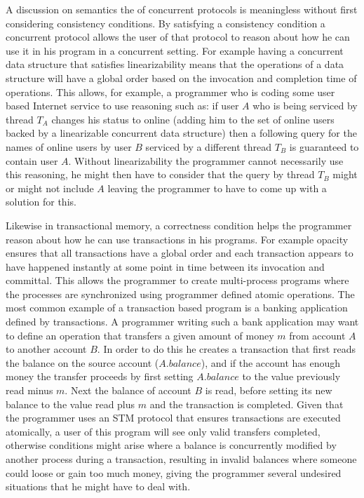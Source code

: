 A discussion on semantics the of concurrent protocols is meaningless without
first considering consistency conditions.
By satisfying a consistency condition a concurrent protocol allows the
user of that protocol to reason about how he can use it in his program
in a concurrent setting.
For example having a concurrent data structure that satisfies linearizability
means that the operations of a data structure will have a global order
based on the invocation and completion time of operations.
This allows, for example, a programmer who is coding some user based Internet service
to use reasoning such as: if user $A$ who
is being serviced by thread $T_A$ changes his status to online (adding him
to the set of online users backed by a linearizable concurrent data structure)
then a following query for the names of online users
by user $B$ serviced by a different thread $T_B$ is guaranteed to contain
user $A$.
Without linearizability the programmer cannot necessarily use this reasoning, he might then
have to consider that the query by thread $T_B$ might or might not include $A$
leaving the programmer to have to come up with a solution for this.

Likewise in transactional memory, a correctness condition helps the
programmer reason about how he can use transactions in his programs.
For example opacity ensures that all transactions have a global order
and each transaction appears to have happened instantly at some point
in time between its invocation and committal.
This allows the programmer to create multi-process programs where the processes are
synchronized using programmer defined atomic operations.
The most common example of a transaction based program is a banking application defined by transactions.
A programmer writing such a bank application may want to define an operation
that transfers a given amount of money $m$ from account $A$ to another account $B$.
In order to do this he creates a transaction that first reads the balance
on the source account ($A.balance$), and if the account has enough money the transfer
proceeds by first setting $A.balance$ to the value previously read minus $m$.
Next the balance of account $B$ is read, before setting its new balance
to the value read plus $m$ and the transaction is completed.
Given that the programmer uses an STM protocol that ensures transactions are executed
atomically, a user of this program will see only valid transfers
completed, otherwise conditions might arise where a balance is concurrently
modified by another process during a transaction, resulting in invalid balances
where someone could loose or gain too much money, giving the programmer
several undesired situations that he might have to deal with.

